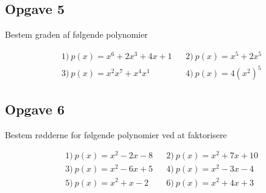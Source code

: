 \subsection*{Opgave 5}
Bestem graden af følgende polynomier

\begin{align*}
	&1) \ p(x) = x^6+ 2x^3 + 4x + 1 & &2) \ p(x) = x^5+ 2x^5\\
	&3) \ p(x) = x^2x^7+x^4x^1 & &4) \ p(x) = 4(x^2)^5
\end{align*}

\subsection*{Opgave 6}
Bestem rødderne for følgende polynomier ved at faktorisere

\begin{align*}
	&1) \ p(x) = x^2 - 2x - 8 & &2) \ p(x) = x^2 +7x + 10  \\
	&3) \ p(x) = x^2 - 6x + 5  & &4) \ p(x) = x^2 - 3x - 4 \\
	&5) \ p(x) = x^2 + x - 2 & &6) \ p(x) = x^2 + 4x + 3 \\
\end{align*}